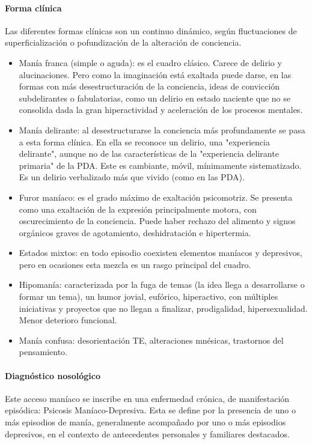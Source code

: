 \documentclass{scrbook}
\begin{document}
\paragraph{Forma clínica}
Las diferentes formas clínicas son un continuo dinámico, según fluctuaciones de superficialización o pofundización de la alteración de conciencia.
\begin{itemize}
	\item Manía franca (simple o aguda): es el cuadro clásico. Carece de delirio y alucinaciones. Pero como la imaginación está exaltada puede darse, en las formas con más desestructuración de la conciencia, ideas de convicción subdelirantes o fabulatorias, como un delirio en estado naciente que no se consolida dada la gran hiperactividad y aceleración de los procesos mentales.
	\item Manía delirante: al desestructurarse la conciencia más profundamente se pasa a esta forma clínica. En ella se reconoce un delirio, una "experiencia delirante", aunque no de las características de la "experiencia delirante primaria" de la PDA. Este es cambiante, móvil, mínimamente sistematizado. Es un delirio verbalizado más que vivido (como en las PDA).
	\item Furor maníaco: es el grado máximo de exaltación psicomotriz. Se presenta como una exaltación de la expresión principalmente motora, con oscurecimiento de la conciencia. Puede haber rechazo del alimento y signos orgánicos graves de agotamiento, deshidratación e hipertermia.
	\item Estados mixtos: en todo episodio coexisten elementos maníacos y depresivos, pero en ocasiones esta mezcla es un rasgo principal del cuadro.
	\item Hipomanía: caracterizada por la fuga de temas (la idea llega a desarrollarse o formar un tema), un humor jovial, eufórico, hiperactivo, con múltiples iniciativas y proyectos que no llegan a finalizar, prodigalidad, hipersexualidad. Menor deterioro funcional.
	\item Manía confusa: desorientación TE, alteraciones mnésicas, trastornos del pensamiento.
\end{itemize}
\paragraph{Diagnóstico nosológico}
Este acceso maníaco se inscribe en una enfermedad crónica, de manifestación episódica: Psicosis Maníaco-Depresiva. Esta se define por la presencia de uno o más episodios de manía, generalmente acompañado por uno o más episodios depresivos, en el contexto de antecedentes personales y familiares destacados.
\end{document}
